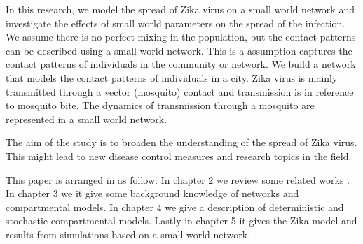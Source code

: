 In this research, we model the spread of Zika virus on a small world network and investigate the effects of small world parameters on the spread of the infection. We assume there is no perfect mixing in the population, but the contact patterns  can be described using a small world network. This is a  assumption captures the contact patterns of individuals in the community or network.  We build a network that models the contact patterns of individuals in a city.
Zika virus is mainly transmitted through a vector (mosquito) contact and transmission is in reference to mosquito bite. The dynamics of transmission through a mosquito are represented in a small world network.

The aim of the study is to broaden the understanding of the spread of Zika virus. This might lead to new disease control measures and research topics in the field.

This paper is arranged in as follow: In chapter 2 we review some related works . In chapter 3 we  it give some background knowledge of networks and compartmental models. In chapter 4 we  give a description of deterministic and stochastic compartmental models. Lastly in chapter 5 it gives the Zika model and results from simulations based on a small world network.

